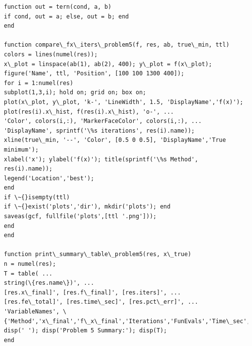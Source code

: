 \documentclass[11pt]{article}
\begin{document}
\begin{lstlisting}[basicstyle=\ttfamily\small]
function out = tern(cond, a, b)
if cond, out = a; else, out = b; end
end

function compare\_fx\_iters\_problem5(f, res, ab, true\_min, ttl)
colors = lines(numel(res));
x\_plot = linspace(ab(1), ab(2), 400); y\_plot = f(x\_plot);
figure('Name', ttl, 'Position', [100 100 1300 400]);
for i = 1:numel(res)
subplot(1,3,i); hold on; grid on; box on;
plot(x\_plot, y\_plot, 'k-', 'LineWidth', 1.5, 'DisplayName','f(x)');
plot(res(i).x\_hist, f(res(i).x\_hist), 'o-', ...
'Color', colors(i,:), 'MarkerFaceColor', colors(i,:), ...
'DisplayName', sprintf('\%s iterations', res(i).name));
xline(true\_min, '--', 'Color', [0.5 0 0.5], 'DisplayName','True minimum');
xlabel('x'); ylabel('f(x)'); title(sprintf('\%s Method', res(i).name));
legend('Location','best');
end
if \~{}isempty(ttl)
if \~{}exist('plots','dir'), mkdir('plots'); end
saveas(gcf, fullfile('plots',[ttl '.png']));
end
end

function print\_summary\_table\_problem5(res, x\_true)
n = numel(res);
T = table( ...
string(\{res.name\})', ...
[res.x\_final]', [res.f\_final]', [res.iters]', ...
[res.fe\_total]', [res.time\_sec]', [res.pct\_err]', ...
'VariableNames', \{'Method','x\_final','f\_x\_final','Iterations','FunEvals','Time\_sec','PctErr\_from\_true\_x'\});
disp(' '); disp('Problem 5 Summary:'); disp(T);
end
	\end{lstlisting}
	
\end{document}
